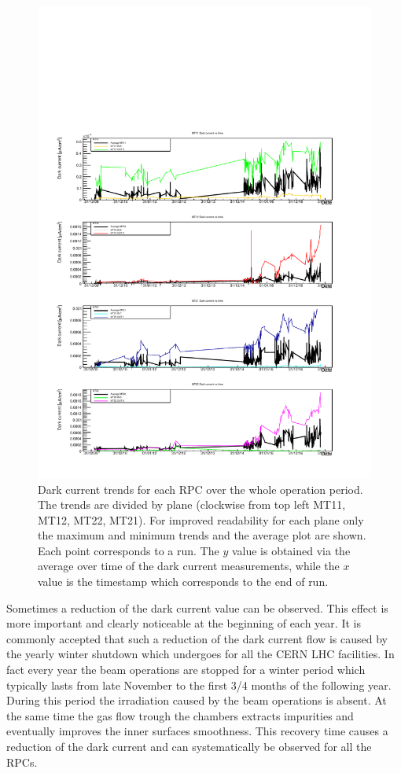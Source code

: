 \begin{figure}[!t]
\begin{center}
\includegraphics[width=0.95\linewidth]{Chapters/Performance/Figs/iDark4PlanesMM.pdf}
\caption{Dark current trends for each RPC over the whole operation period. The trends are divided by plane (clockwise from top left MT11, MT12, MT22, MT21). For improved readability for each plane only the maximum and minimum trends and the average plot are shown. Each point corresponds to a run. The $y$ value is obtained via the average over time of the dark current measurements, while the $x$ value is the timestamp which corresponds to the end of run.}
\label{fig:iDark4Planes}
\end{center}
\end{figure}

Sometimes a reduction of the dark current value can be observed.
This effect is more important and clearly noticeable at the beginning of each year.
It is commonly accepted that such a reduction of the dark current flow is caused by the yearly winter shutdown which undergoes for all the CERN LHC facilities.
In fact every year the beam operations are stopped for a winter period which typically lasts from late November to the first 3/4 months of the following year.
During this period the irradiation caused by the beam operations is absent.
At the same time the gas flow trough the chambers extracts impurities and eventually improves the inner surfaces smoothness.
This recovery time causes a reduction of the dark current and can systematically be observed for all the RPCs.

